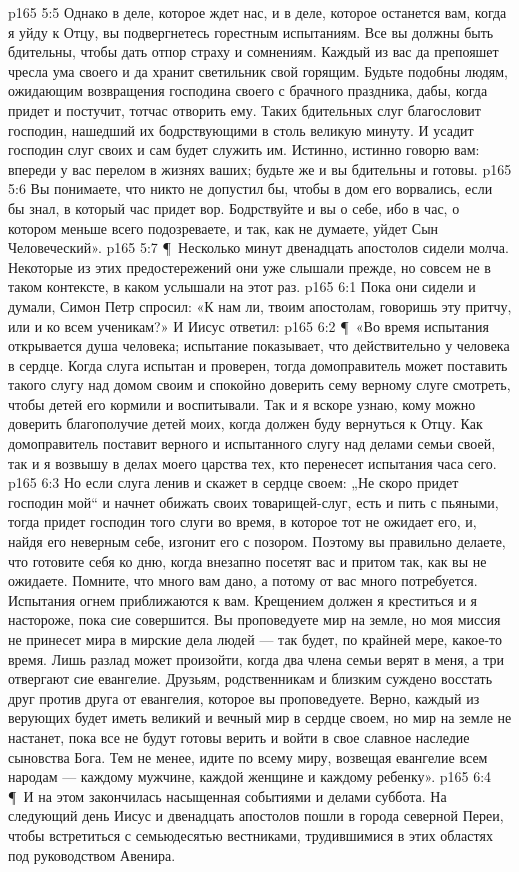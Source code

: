\vs p165 5:5 Однако в деле, которое ждет нас, и в деле, которое останется вам, когда я уйду к Отцу, вы подвергнетесь горестным испытаниям. Все вы должны быть бдительны, чтобы дать отпор страху и сомнениям. Каждый из вас да препояшет чресла ума своего и да хранит светильник свой горящим. Будьте подобны людям, ожидающим возвращения господина своего с брачного праздника, дабы, когда придет и постучит, тотчас отворить ему. Таких бдительных слуг благословит господин, нашедший их бодрствующими в столь великую минуту. И усадит господин слуг своих и сам будет служить им. Истинно, истинно говорю вам: впереди у вас перелом в жизнях ваших; будьте же и вы бдительны и готовы.
\vs p165 5:6 Вы понимаете, что никто не допустил бы, чтобы в дом его ворвались, если бы знал, в который час придет вор. Бодрствуйте и вы о себе, ибо в час, о котором меньше всего подозреваете, и так, как не думаете, уйдет Сын Человеческий».
\vs p165 5:7 \P\ Несколько минут двенадцать апостолов сидели молча. Некоторые из этих предостережений они уже слышали прежде, но совсем не в таком контексте, в каком услышали на этот раз.
\vs p165 6:1 Пока они сидели и думали, Симон Петр спросил: «К нам ли, твоим апостолам, говоришь эту притчу, или и ко всем ученикам?» И Иисус ответил:
\vs p165 6:2 \P\ «Во время испытания открывается душа человека; испытание показывает, что действительно у человека в сердце. Когда слуга испытан и проверен, тогда домоправитель может поставить такого слугу над домом своим и спокойно доверить сему верному слуге смотреть, чтобы детей его кормили и воспитывали. Так и я вскоре узнаю, кому можно доверить благополучие детей моих, когда должен буду вернуться к Отцу. Как домоправитель поставит верного и испытанного слугу над делами семьи своей, так и я возвышу в делах моего царства тех, кто перенесет испытания часа сего.
\vs p165 6:3 Но если слуга ленив и скажет в сердце своем: „Не скоро придет господин мой“ и начнет обижать своих товарищей\hyp{}слуг, есть и пить с пьяными, тогда придет господин того слуги во время, в которое тот не ожидает его, и, найдя его неверным себе, изгонит его с позором. Поэтому вы правильно делаете, что готовите себя ко дню, когда внезапно посетят вас и притом так, как вы не ожидаете. Помните, что много вам дано, а потому от вас много потребуется. Испытания огнем приближаются к вам. Крещением должен я креститься и я настороже, пока сие совершится. Вы проповедуете мир на земле, но моя миссия не принесет мира в мирские дела людей --- так будет, по крайней мере, какое\hyp{}то время. Лишь разлад может произойти, когда два члена семьи верят в меня, а три отвергают сие евангелие. Друзьям, родственникам и близким суждено восстать друг против друга от евангелия, которое вы проповедуете. Верно, каждый из верующих будет иметь великий и вечный мир в сердце своем, но мир на земле не настанет, пока все не будут готовы верить и войти в свое славное наследие сыновства Бога. Тем не менее, идите по всему миру, возвещая евангелие всем народам --- каждому мужчине, каждой женщине и каждому ребенку».
\vs p165 6:4 \P\ И на этом закончилась насыщенная событиями и делами суббота. На следующий день Иисус и двенадцать апостолов пошли в города северной Переи, чтобы встретиться с семьюдесятью вестниками, трудившимися в этих областях под руководством Авенира.
